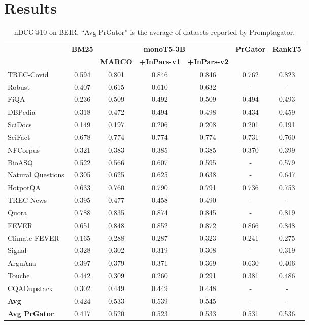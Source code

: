 \documentclass{article}
\begin{document}
\section{Results}

\begin{table}[ht]
\centering
\begin{tabular}{l|c|ccc|cc}
\toprule
\multicolumn{1}{l|}{} &
  \multirow{2}{*}{\textbf{BM25}} &
  \multicolumn{3}{c|}{\textbf{monoT5-3B}} &
  \multicolumn{1}{l}{\multirow{2}{*}{\textbf{PrGator}}} &
  \multicolumn{1}{l}{\multirow{2}{*}{\textbf{RankT5}}} \\
\multicolumn{1}{l|}{} &
   &
  \textbf{MARCO} &
  \textbf{+InPars-v1} &
  \textbf{+InPars-v2} &
  \multicolumn{1}{l}{} &
  \multicolumn{1}{l}{} \\ \midrule
TREC-Covid    & 0.594 & 0.801 & 0.846 & 0.846 & 0.762 & 0.823 \\
Robust        & 0.407 & 0.615 & 0.610 & 0.632 & -     & -     \\
FiQA          & 0.236 & 0.509 & 0.492 & 0.509 & 0.494 & 0.493 \\
DBPedia       & 0.318 & 0.472 & 0.494 & 0.498 & 0.434 & 0.459 \\
SciDocs       & 0.149 & 0.197 & 0.206 & 0.208 & 0.201 & 0.191 \\
SciFact       & 0.678 & 0.774 & 0.774 & 0.774 & 0.731 & 0.760 \\
NFCorpus      & 0.321 & 0.383 & 0.385 & 0.385 & 0.370 & 0.399 \\
BioASQ        & 0.522 & 0.566 & 0.607 & 0.595 & -     & 0.579 \\
Natural Questions            & 0.305 & 0.625 & 0.625 & 0.638 & -     & 0.647 \\
HotpotQA      & 0.633 & 0.760 & 0.790 & 0.791 & 0.736 & 0.753 \\
TREC-News     & 0.395 & 0.477 & 0.458 & 0.490 & -     & -     \\
Quora         & 0.788 & 0.835 & 0.874 & 0.845 & -     & 0.819 \\
FEVER         & 0.651 & 0.848 & 0.852 & 0.872 & 0.866 & 0.848 \\
Climate-FEVER & 0.165 & 0.288 & 0.287 & 0.323 & 0.241 & 0.275 \\
Signal        & 0.328 & 0.302 & 0.319 & 0.308 & -     & 0.319 \\
ArguAna       & 0.397 & 0.379 & 0.371 & 0.369 & 0.630     & 0.406 \\
Touche        & 0.442 & 0.309 & 0.260 & 0.291 & 0.381 & 0.486 \\
CQADupstack   & 0.302 & 0.449 & 0.449 & 0.448 & -     & -     \\ \midrule
\textbf{Avg}           & 0.424 & 0.533 & 0.539 & 0.545 & -     & -     \\
\textbf{Avg PrGator}           & 0.417 & 0.520 & 0.523 & 0.533 & 0.531  & 0.536    \\ \bottomrule
\end{tabular}
\vspace{0.1cm}
\caption{nDCG@10 on BEIR. ``Avg PrGator'' is the average of datasets reported by Promptagator.}
\label{tab:main-results}
\end{table}
\end{document}
